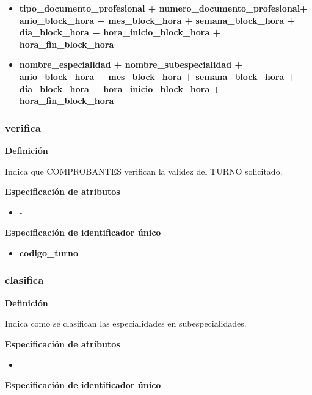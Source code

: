 \documentclass[a4paper,11pt]{article}
\begin{document}
\begin{itemize}

     \item \textbf{tipo\_documento\_profesional + numero\_documento\_profesional+ anio\_block\_hora + mes\_block\_hora + semana\_block\_hora + día\_block\_hora + hora\_inicio\_block\_hora + hora\_fin\_block\_hora}

     \item \textbf{nombre\_especialidad + nombre\_subespecialidad + anio\_block\_hora + mes\_block\_hora + semana\_block\_hora + día\_block\_hora + hora\_inicio\_block\_hora + hora\_fin\_block\_hora} 
		


\end{itemize}

\subsubsection{\textbf{verifica}}

\textbf{Definición}

Indica que COMPROBANTES verifican la validez del TURNO solicitado.

\textbf{Especificación de atributos}

\begin{itemize}
\item -
\end{itemize}

\textbf{Especificación de identificador único}

\begin{itemize}

     \item \textbf{codigo\_turno}

\end{itemize}


\subsubsection{\textbf{clasifica}}

\textbf{Definición}

Indica como se clasifican las especialidades en subespecialidades.

\textbf{Especificación de atributos}

\begin{itemize}
\item -
\end{itemize}

\textbf{Especificación de identificador único}
\end{document}
